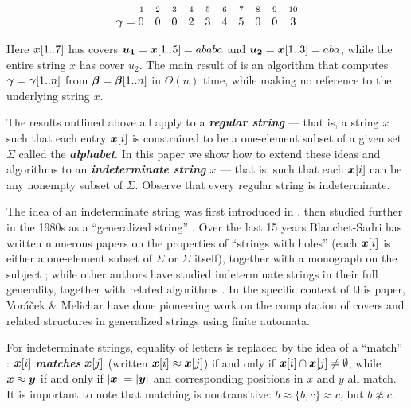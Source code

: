 \documentclass[runningheads,a4paper]{llncs}
\def\s#1{\mbox{\boldmath $#1$}}
\def\itbf#1{\textit{\textbf{#1}}}
\begin{document}
\begin{equation*}
\begin{array}{rcccccccccc}
\scriptstyle 1 & \scriptstyle 2 & \scriptstyle 3 & \scriptstyle 4 & \scriptstyle 5 & \scriptstyle 6 & \scriptstyle 7 & \scriptstyle 8 & \scriptstyle 9 & \scriptstyle 10 \\
\s{\gamma} = 0 & 0 & 0 & 2 & 3 & 4 & 5 & 0 & 0 & 3
\end{array} 
\end{equation*} 

Here $\s{x}[1..7]$ has covers $\s{u_1} = \s{x}[1..5] = ababa$
and $\s{u_2} = \s{x}[1..3] = aba$,
while the entire string \s{x} has cover \s{u_2}.
The main result of \cite{LS02} is an algorithm that computes
$\s{\gamma} = \s{\gamma}[1..n]$ from $\s{\beta} = \s{\beta}[1..n]$
in $\Theta(n)$ time, while making no reference
to the underlying string \s{x}.

The results outlined above all apply to a \itbf{regular string} --- that
is, a string \s{x} such that each entry $\s{x}[i]$ is constrained to be a one-element
subset of a given set $\Sigma$ called the \itbf{alphabet}.
In this paper we show how to extend these ideas and algorithms
to an \itbf{indeterminate string} \s{x} --- that is,
such that each $\s{x}[i]$ can be any nonempty subset of $\Sigma$.
Observe that every regular string is indeterminate.

The idea of an indeterminate string was first introduced in
\cite{FP74}, then studied further in the 1980s as a ``generalized string''
\cite{A87}.
Over the last 15 years Blanchet-Sadri has written
numerous papers on the properties of ``strings with holes''
(each $\s{x}[i]$ is either a one-element subset of $\Sigma$
or $\Sigma$ itself),
together with a monograph on the subject \cite{BS07};
while other authors have studied indeterminate strings
in their full generality, together with related algorithms
\cite{BRS09,NRR12,HS03,HSW08,SW08,SW09a,SW09,CRSW13}.
In the specific context of this paper, Vor\'{a}\v{c}ek \& Melichar \cite{VM05}
have done pioneering work on the computation of covers and related structures
in generalized strings using finite automata.

For indeterminate strings, equality of letters
is replaced by the idea of a ``match'' \cite{HS03}:
$\s{x}[i]$ \itbf{matches} $\s{x}[j]$
(written $\s{x}[i] \approx \s{x}[j]$) if and only if
$\s{x}[i] \cap \s{x}[j] \ne \emptyset$,
while $\s{x} \approx \s{y}$ if and only if
$|\s{x}| = |\s{y}|$ and corresponding positions in
\s{x} and \s{y} all match.
It is important to note that matching is nontransitive:
$b \approx \{b,c\} \approx c$, but $b \not\approx c$.
\end{document}
